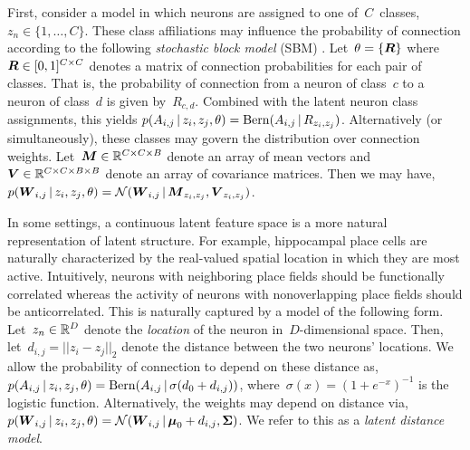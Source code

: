 First, consider a model in which neurons are assigned to one of~$C$~classes,~$z_n \in \{1, \ldots, C\}$. 
These class affiliations may influence the probability of connection according to the following \emph{stochastic block model} (SBM) \cite{Nowicki-2001}. 
Let~$\theta = \{\boldsymbol{R}\}$ where~${\boldsymbol{R} \in [0,1]^{C \times C}}$ denotes a matrix of connection probabilities for each pair of classes. 
That is, the probability of connection from a neuron of class~$c$ to a neuron of class~$d$ is given by~$R_{c,d}$.
Combined with the latent neuron class assignments, this yields
${p(A_{i,j} \,|\, z_i, z_j, \theta) = \mathrm{Bern}(A_{i,j} \,|\, R_{z_i, z_j})}$.
Alternatively (or simultaneously), these classes may govern the distribution over connection weights. 
Let~${\boldsymbol{M} \in \mathbb{R}^{C \times C \times B}}$ denote an array of mean vectors and~
${\boldsymbol{V} \in \mathbb{R}^{C \times C \times B \times B}}$ denote an array of covariance matrices. 
Then we may have,
${p(\boldsymbol{W}_{i,j} \,|\, z_i, z_j, \theta) = \mathcal{N}(\boldsymbol{W}_{i,j} \,|\, \boldsymbol{M}_{z_i, z_j}, \boldsymbol{V}_{z_i,z_j})}$.

In some settings, a continuous latent feature space is a more natural representation of latent structure. 
For example, hippocampal place cells are naturally characterized by the real-valued spatial location in which they are most active. 
Intuitively, neurons with neighboring place fields should be functionally correlated whereas the activity of neurons with nonoverlapping place fields should be anticorrelated.
This is naturally captured by a model of the following form.
Let~$z_n \in \mathbb{R}^D$ denote the \emph{location} of the neuron in~$D$-dimensional space. 
Then, let~${d_{i,j} = ||z_i - z_j||_2}$ denote the distance between the two neurons' locations.
We allow the probability of connection to depend on these distance as,
${p(A_{i,j} \,|\, z_i, z_j, \theta) = \mathrm{Bern}(A_{i,j} \,|\, \sigma(d_0 + d_{i,j}))}$,
where~${\sigma(x)=(1+e^{-x})^{-1}}$ is the logistic function.
Alternatively, the weights may depend on distance via,
${p(\boldsymbol{W}_{i,j} \,|\, z_i, z_j, \theta) = \mathcal{N}(\boldsymbol{W}_{i,j} \,|\, \boldsymbol{\mu}_0 + d_{i,j}, \boldsymbol{\Sigma})}$.
We refer to this as a \emph{latent distance model}.



